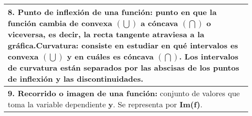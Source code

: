 \begin{table}[]
\begin{tabular}{|p{5cm}|}
		\textbf{8. Punto de inflexión de una función:} punto en que la función cambia de convexa $(\bigcup)$ a cóncava $(\bigcap)$ o viceversa, es decir, la recta tangente atraviesa a la gráfica.\newline \textbf{Curvatura:} consiste en estudiar en qué intervalos es convexa $(\bigcup)$ y en cuáles es cóncava $(\bigcap)$. Los intervalos de curvatura están separados por las abscisas de los puntos de inflexión y las discontinuidades.\\ \hline
		\textbf{9. Recorrido o imagen de una función:} conjunto de valores que toma la variable dependiente \textbf{y}. Se representa por \textbf{Im(f)}.\\ \hline
	\end{tabular}
	
\end{table}

